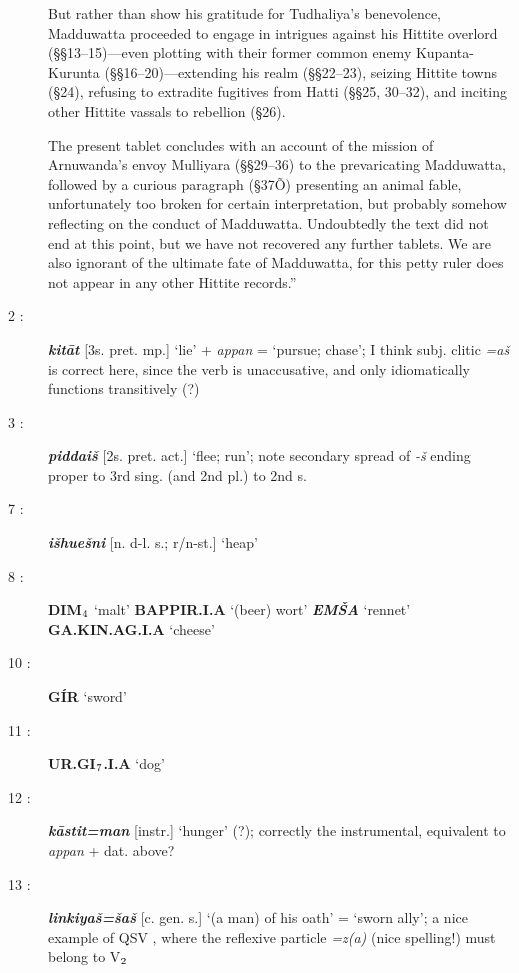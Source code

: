 \documentclass[10pt]{article}
\newcommand{\subsc}[1]{$_{\textrm{\scriptsize{#1}}}$}	%
\newcommand{\bit}[1]{\textbf{\textit{#1}}}				%
\newcommand{\p}[1]{{\tiny[{#1}]}}					%
\newcommand{\Hith}{\textsubwedge{H}}
\renewcommand{\.}[1]{\textsubdot{#1}}
\begin{document}
\begin{description}
But rather than show his gratitude for Tudhaliya's benevolence, Madduwatta proceeded to engage in intrigues against his Hittite overlord (\S\S13--15)---even plotting with their former common enemy Kupanta-Kurunta (\S\S16--20)---extending his realm (\S\S22--23), seizing Hittite towns (\S24), refusing to extradite fugitives from Hatti (\S\S25, 30--32), and inciting other Hittite vassals to rebellion (\S26).

The present tablet concludes with an account of the mission of Arnuwanda's envoy Mulliyara (\S\S29--36) to the prevaricating Madduwatta, followed by a curious paragraph (\S37Õ) presenting an animal fable, unfortunately too broken for certain interpretation, but probably somehow reflecting on the conduct of Madduwatta. Undoubtedly the text did not end at this point, but we have not recovered any further tablets. We are also ignorant of the ultimate fate of Madduwatta, for this petty ruler does not appear in any other Hittite records.'' \\


\item[2 :] \bit{kit\=at} \p{3s. pret. mp.} `lie' + \textit{appan} = `pursue; chase'; I think subj. clitic \textit{=a\v{s}} is correct here, since the verb is unaccusative, and only idiomatically functions transitively (?)

\item[3 :] \bit{piddai\v{s}} \p{2s. pret. act.} `flee; run'; note secondary spread of \textit{-\v{s}} ending proper to 3rd sing. (and 2nd pl.) to 2nd s.

\item[7 :] \bit{i\v{s}hue\v{s}ni} \p{n. d-l. s.; r/n-st.} `heap' 

\item[8 :] \textbf{DIM\subsc{4}} `malt' \textbf{BAPPIR.{\Hith}I.A} `(beer) wort'  \bit{EM\v{S}A} `rennet' \textbf{GA.KIN.AG.{\Hith}I.A} `cheese'

\item[10 :] \textbf{G\'IR} `sword'

\item[11 :] \textbf{UR.GI\subsc{7}.{\Hith}I.A} `dog'

\item[12 :] \bit{k\=astit=man} \p{instr.} `hunger' (?); correctly the instrumental, equivalent to \textit{appan} + dat. above?

\item[13 :] \bit{linkiya\v{s}=\v{s}a\v{s}} \p{c. gen. s.} `(a man) of his oath' = `sworn ally'; a nice example of QSV , where the reflexive particle \textit{=z(a)} (nice spelling!) must belong to V\subsc{2}


\end{description}
\end{document}
